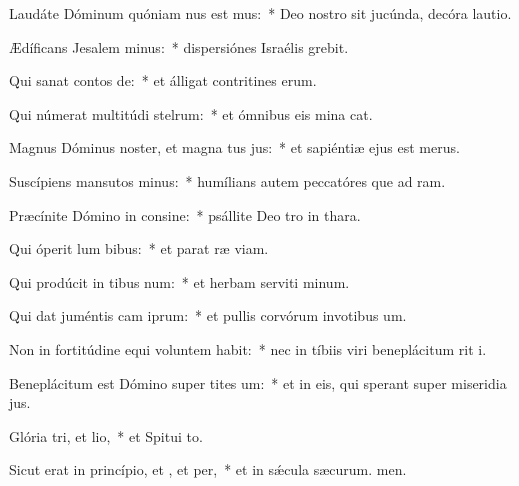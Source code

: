 \item Laudáte Dóminum quóniam nus est mus:~* Deo nostro sit jucúnda, decóra lautio.
\item Ædíficans Jesalem minus:~* dispersiónes Israélis grebit.
\item Qui sanat contos de:~* et álligat contritines erum.
\item Qui númerat multitúdi stelrum:~* et ómnibus eis mina cat.
\item Magnus Dóminus noster, et magna tus jus:~* et sapiéntiæ ejus  est merus.
\item Suscípiens mansutos minus:~* humílians autem peccatóres que ad ram.
\item Præcínite Dómino in consine:~* psállite Deo tro in thara.
\item Qui óperit lum bibus:~* et parat ræ viam.
\item Qui prodúcit in tibus num:~* et herbam serviti minum.
\item Qui dat juméntis cam iprum:~* et pullis corvórum invotibus um.
\item Non in fortitúdine equi voluntem habit:~* nec in tíbiis viri beneplácitum rit i.
\item Beneplácitum est Dómino super tites um:~* et in eis, qui sperant super miseridia jus.
\item Glória tri, et lio,~* et Spitui to.
\item Sicut erat in princípio, et , et per,~* et in sǽcula sæcurum. men.
